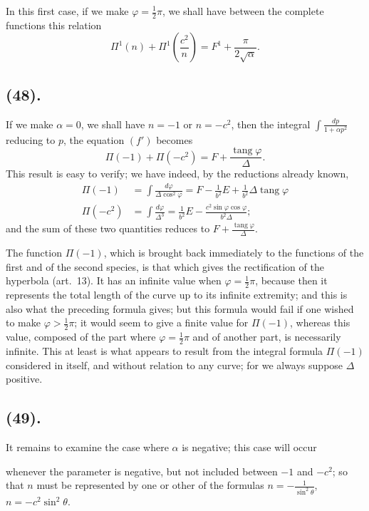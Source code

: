 \documentclass{article}
\begin{document}
In this first case, if we make $\varphi=\frac{1}{2}\pi$, we shall have between the complete functions this relation
\[ \Pi^{1}(n)+\Pi^{1}\left(\frac{c^{2}}{n}\right)=F^{1}+\frac{\pi}{2\sqrt{\alpha}}. \]

\subsection*{(48).}

If we make $\alpha=0$, we shall have $n=-1$ or $n=-c^{2}$, then the integral $\displaystyle\int\frac{dp}{1+\alpha p^{2}}$ reducing to $p$, the equation $(f')$ becomes
\[ \Pi(-1)+\Pi(-c^{2})=F+\frac{\operatorname{tang}\varphi}{\Delta}. \]
This result is easy to verify; we have indeed, by the reductions already known,
\[ \begin{aligned} \Pi(-1)&=\int\frac{d\varphi}{\Delta\cos^{2}\varphi}=F-\frac{1}{b^{2}}E+\frac{1}{b^{2}}\Delta\operatorname{tang}\varphi\\ \Pi(-c^{2})&=\int\frac{d\varphi}{\Delta^{3}}=\frac{1}{b^{2}}E-\frac{c^{2}\sin\varphi\cos\varphi}{b^{2}\Delta}; \end{aligned} \]
and the sum of these two quantities reduces to $F+\frac{\operatorname{tang}\varphi}{\Delta}$.

The function $\Pi(-1)$, which is brought back immediately to the functions of the first and of the second species, is that which gives the rectification of the hyperbola (art.\ 13). It has an infinite value when $\varphi=\frac{1}{2}\pi$, because then it represents the total length of the curve up to its infinite extremity; and this is also what the preceding formula gives; but this formula would fail if one wished to make $\varphi>\frac{1}{2}\pi$; it would seem to give a finite value for $\Pi(-1)$, whereas this value, composed of the part where $\varphi=\frac{1}{2}\pi$ and of another part, is necessarily infinite. This at least is what appears to result from the integral formula $\Pi(-1)$ considered in itself, and without relation to any curve; for we always suppose $\Delta$ positive.

\subsection*{(49).}

It remains to examine the case where $\alpha$ is negative; this case will occur

whenever the parameter is negative, but not included between $-1$ and $-c^{2}$; so that $n$ must be represented by one or other of the formulas $n=-\frac{1}{\sin^{2}\theta}$, $n=-c^{2}\sin^{2}\theta$.
\end{document}
